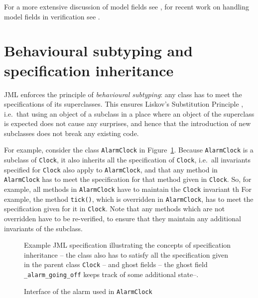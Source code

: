 \documentclass{llncs}
\begin{document}
For a more extensive discussion of model fields see \cite{Cheon-etal05},
for recent work on handling model fields in verification see 
\cite{LeinoMuller06}.

\section{Behavioural subtyping and specification inheritance}
\label{Sec:behsubtyping}

JML enforces the principle of \emph{behavioural subtyping}: any class
has to meet the specifications of its superclasses.
This ensures Liskov's Substitution Principle \cite{LiskovWing94},
i.e.\ that using an object of a subclass in a place where an object of 
the superclass is expected does not cause any surprises, and hence that 
the introduction of new subclasses does not break any existing code.

For example, consider the class \texttt{AlarmClock} in Figure~\ref{Example:alarmclock}.
Because \texttt{AlarmClock} is a subclass of \texttt{Clock}, it also
inherits all the specification of \texttt{Clock}, i.e.\ 
all invariants specified for \texttt{Clock} also apply to \texttt{AlarmClock},
and that any method in \texttt{AlarmClock} has to meet the specification
for that method given in  \texttt{Clock}.
So, for example, all methods in \texttt{AlarmClock} have to maintain the
\texttt{Clock} invariant th
For example, the method \texttt{tick()}, which is overridden in \texttt{AlarmClock},
has to meet the specification given for it in \texttt{Clock}. 
Note that any methods which are not overridden have to be re-verified, to ensure 
that they maintain any additional invariants of the subclass.

\begin{figure}[tbp] \label{Example:alarmclock}
%

%
\vspace*{-2ex} %
\caption{Example JML specification illustrating the concepts of 
specification inheritance -- the class also has to satisfy all
the specification given in the parent class \texttt{Clock} -- and 
ghost fields -- the ghost field \texttt{\_alarm\_going\_off}
keeps track of some additional state--.}
\end{figure}

\begin{figure}[tbp] \label{Example:alarminterface}
%

%
\vspace*{-2ex} %
\caption{Interface of the alarm used in \texttt{AlarmClock}}
\end{figure}
\end{document}
